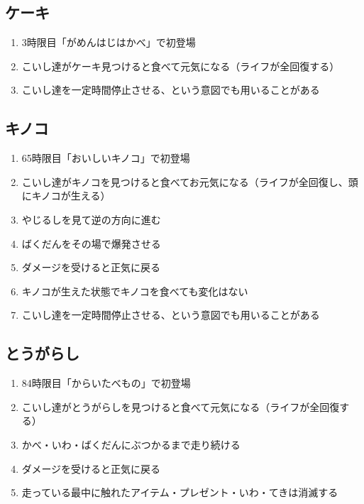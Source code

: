 \subsection{ケーキ}
\begin{enumerate}[label={\sarrow}]
\item 3時限目「がめんはじはかべ」で初登場
\item こいし達がケーキ見つけると食べて元気になる（ライフが全回復する）
\item こいし達を一定時間停止させる、という意図でも用いることがある
\end{enumerate}


\clearpage
\subsection{キノコ}
\begin{enumerate}[label={\sarrow}]
\item 65時限目「おいしいキノコ」で初登場
\item こいし達がキノコを見つけると食べてお元気になる（ライフが全回復し、頭にキノコが生える）
\item やじるしを見て逆の方向に進む
\item ばくだんをその場で爆発させる
\item ダメージを受けると正気に戻る
\item キノコが生えた状態でキノコを食べても変化はない
\item こいし達を一定時間停止させる、という意図でも用いることがある
\end{enumerate}


\subsection{とうがらし}
\begin{enumerate}[label={\sarrow}]
\item 84時限目「からいたべもの」で初登場
\item こいし達がとうがらしを見つけると食べて元気になる（ライフが全回復する）
\item かべ・いわ・ばくだんにぶつかるまで走り続ける
\item ダメージを受けると正気に戻る
\item 走っている最中に触れたアイテム・プレゼント・いわ・てきは消滅する
\end{enumerate}


